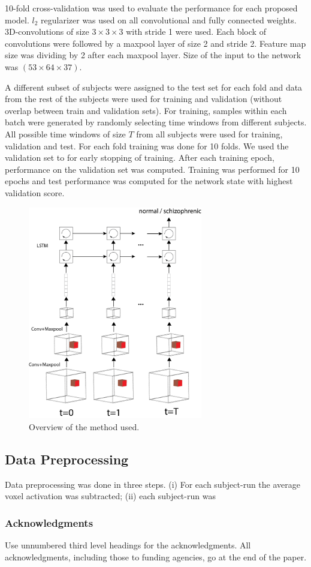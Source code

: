 \documentclass{article} %
\begin{document}
10-fold cross-validation was used to evaluate the performance for each proposed model. $l_2$ regularizer was used on all convolutional and fully connected weights. 
3D-convolutions of size $3\times3\times3$ with stride 1 were used. Each block of convolutions were followed by a maxpool layer of size 2 and stride 2. Feature map size was dividing by 2 after each maxpool layer. Size of the input to the network was $(53\times64\times37)$.

A different subset of subjects were assigned to the test set for each fold and data from the rest of the subjects were used for training and validation (without overlap between train and validation sets). For training, samples within each batch were generated by randomly selecting time windows from different subjects. All possible time windows of size $T$ from all subjects were used for training, validation and test. For each fold training was done for 10 folds. We used the validation set to for early stopping of training. After each training epoch, performance on the validation set was computed. Training was performed for 10 epochs and test performance was computed for the network state with highest validation score. 



\begin{figure}[t]
\begin{center}
\includegraphics[width=3in]{figures/overview.png}
\end{center}
\caption{Overview of the method used.}
\label{fig1}
\end{figure}

\subsection{Data Preprocessing}
Data preprocessing was done in three steps. (i) For each subject-run the average voxel activation was subtracted; (ii) each subject-run was 

\subsubsection*{Acknowledgments}

Use unnumbered third level headings for the acknowledgments. All
acknowledgments, including those to funding agencies, go at the end of the paper.



\end{document}
